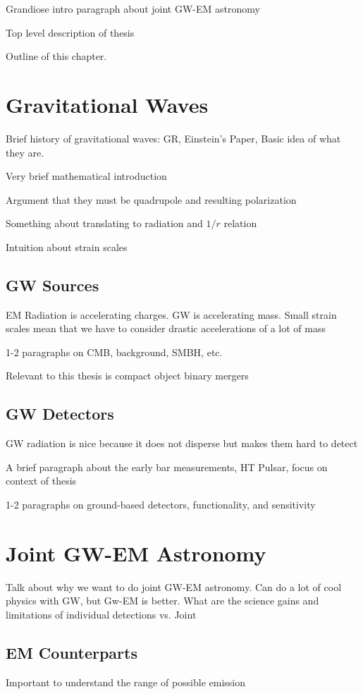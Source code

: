 Grandiose intro paragraph about joint GW-EM astronomy

Top level description of thesis 

Outline of this chapter.

\section{Gravitational Waves}
\label{sec:intro_gw}
Brief history of gravitational waves: GR, Einstein's Paper, Basic idea of what they are.

Very brief mathematical introduction

Argument that they must be quadrupole and resulting polarization

Something about translating to radiation and $1/r$ relation

Intuition about strain scales

\subsection{GW Sources}
\label{sec:intro_gw_source}
EM Radiation is accelerating charges. GW is accelerating mass. Small strain scales mean that we have to consider drastic accelerations of a lot of mass

1-2 paragraphs on CMB, background, SMBH, etc.

Relevant to this thesis is compact object binary mergers

\subsection{GW Detectors}
\label{sec:intro_gw_det}
GW radiation is nice because it does not disperse but makes them hard to detect

A brief paragraph about the early bar measurements, HT Pulsar, focus on context of thesis

1-2 paragraphs on ground-based detectors, functionality, and sensitivity 

\section{Joint GW-EM Astronomy}
\label{sec:intro_joint}
Talk about why we want to do joint GW-EM astronomy. Can do a lot of cool physics with GW, but Gw-EM is better. What are the science gains and limitations of individual detections vs. Joint

\subsection{EM Counterparts}
\label{sec:intro_counterparts}
Important to understand the range of possible emission

